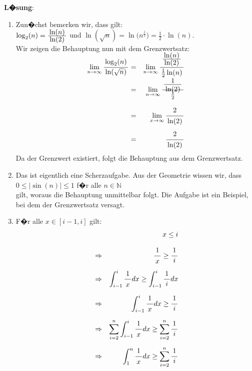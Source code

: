\documentclass{article}
\newcommand{\bruch}[2]{\frac{\displaystyle \raisebox{1pt}[0pt][-0pt]{$\,#1\,$}}{\displaystyle \raisebox{0pt}[9pt]{$\,#2\,$}}}
\begin{document}
\textbf{L�sung}:
\begin{enumerate}
\item Zun�chst bemerken wir, dass gilt:
      \\[0.2cm]
      \hspace*{1.3cm}
      $\log_2(n) = \bruch{\ln(n)}{\ln(2)}$ \quad und \quad
      $\ln(\sqrt{n}) = \ln\bigl(n^\frac{1}{2}\bigr) = \frac{1}{2} \cdot \ln(n)$.
      \\[0.2cm]
      Wir zeigen die Behauptung nun mit dem Grenzwertsatz:
      \begin{eqnarray*}
              \lim\limits_{n \rightarrow \infty} \bruch{\log_2(n)}{\ln(\sqrt{n})}
        & = & \lim\limits_{n \rightarrow \infty} \bruch{\bruch{\ln(n)}{\ln(2)}}{\frac{1}{2}\ln(n)} \\[0.3cm]
        & = & \lim\limits_{n \rightarrow \infty} \bruch{\bruch{1}{\ln(2)}}{\frac{1}{2}} \\[0.3cm]
        & = & \lim\limits_{x \rightarrow \infty} \bruch{2}{\ln(2)} \\[0.2cm]
        & = & \bruch{2}{\ln(2)} 
      \end{eqnarray*}
      Da der Grenzwert existiert, folgt die Behauptung aus dem Grenzwertsatz.
\item Das ist eigentlich eine Scherzaufgabe.  Aus der Geometrie wissen wir, dass 
      \\[0.2cm]
      \hspace*{1.3cm}
      $0 \leq | \sin(n) | \leq 1$ \quad f�r alle $n \in \mathbb{N}$ 
      \\[0.2cm]
      gilt, woraus die Behauptung unmittelbar folgt.  Die Aufgabe ist ein Beispiel, bei dem
      der Grenzwertsatz versagt.
\item F�r alle $x \in [i-1,i]$ gilt:
      \begin{eqnarray*}
      &             & x \leq i \\[0.3cm]
      & \Rightarrow & \bruch{1}{x} \geq \bruch{1}{i} \\[0.2cm]
      & \Rightarrow & \int_{i-1}^i \bruch{1}{x} dx \geq \int_{i-1}^i \bruch{1}{i} dx \\[0.2cm]
      & \Rightarrow & \int_{i-1}^i \bruch{1}{x} dx \geq \bruch{1}{i} \\[0.2cm]
      & \Rightarrow & \sum\limits_{i=2}^{n} \int_{i-1}^i \bruch{1}{x} dx \geq 
                      \sum\limits_{i=2}^{n} \bruch{1}{i}                      \\[0.2cm]
      & \Rightarrow & \int_{1}^n \bruch{1}{x} dx \geq \sum\limits_{i=2}^{n} \bruch{1}{i} \\[0.2cm]

\end{eqnarray*}
\end{enumerate}
\end{document}
